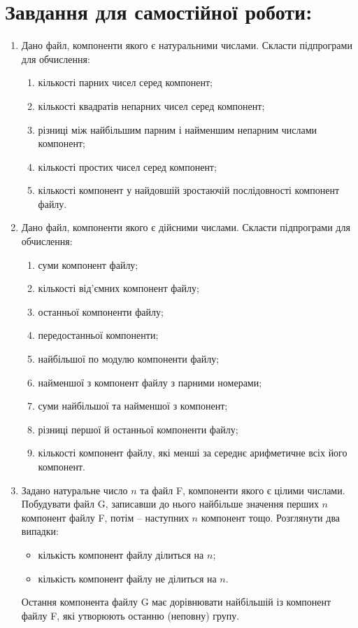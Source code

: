 \documentclass[a5paper,titlepage,openany,twoside,draft]{book_unv}%
\makeatletter
\newcommand{\xslalph}[1]{\expandafter\@xslalph\csname c@#1\endcsname}
\newcommand{\@xslalph}[1]{%
    \ifcase#1\or а\or б\or в\or г\or д\or e\or є\or ж\or з\or i%
    \or й\or к\or л\or м\or н\or о\or п\or р\or с\or т%
    \or у\or ф\or х\or ц\or ч\or ш\or ю\or я\or аа\or бб\or вв%
    \else\@ctrerr\fi%
}
\makeatother
\begin{document}
\section{Завдання для самостійної роботи:}

\begin{enumerate}
\def\labelenumi{\arabic{enumi})}
\setcounter{enumi}{4}
\item
  Дано файл, компоненти якого є натуральними числами. Скласти
  підпрограми для обчислення:
\begin{enumerate}[label=\xslalph*)]
\item
кількості парних чисел серед компонент;
\item
кількості квадратів непарних чисел серед компонент;
\item
різниці між найбільшим парним і найменшим непарним числами компонент;
\item
кількості простих чисел серед компонент;
\item  
кількості компонент у найдовшій зростаючій послідовності компонент
файлу.
\end{enumerate}

\item
  Дано файл, компоненти якого є дійсними числами. Скласти підпрограми
  для обчислення:
\begin{enumerate}[label=\xslalph*)]
\item
суми компонент файлу;
\item
кількості від'ємних компонент файлу;
\item
останньої компоненти файлу;
\item
передостанньої компоненти;
\item 
найбільшої по модулю компоненти файлу;
\item
найменшої з компонент файлу з парними номерами;
\item 
суми найбільшої та найменшої з компонент;
\item
різниці першої й останньої компоненти файлу;
\item
кількості компонент файлу, які менші за середнє арифметичне всіх його
компонент.
\end{enumerate}


\item
  Задано натуральне число $n$ та файл F, компоненти якого є цілими
  числами. Побудувати файл G, записавши до нього найбільше значення
  перших $n$ компонент файлу F, потім -- наступних $n$ компонент тощо.
  Розглянути два випадки:
\begin{itemize}
\item
кількість компонент файлу ділиться на $n$;
\item
кількість компонент файлу не ділиться на $n$. 
\end{itemize}
Остання компонента файлу G має дорівнювати найбільшій із компонент 
файлу F, які утворюють останню (неповну) групу.


\end{enumerate}
\end{document}
